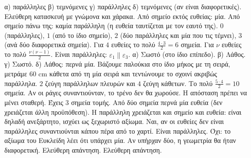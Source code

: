  α) παράλληλες \quad β) τεμνόμενες \quad γ) παράλληλες \quad δ) τεμνόμενες (αν είναι διαφορετικές).
 Ελεύθερη κατασκευή με γνώμονα και χάρακα.
 Από σημείο εκτός ευθείας: μία. Από σημείο πάνω της: καμία παράλληλη (η ευθεία ταυτίζεται με τον εαυτό της).
 $0$ (παράλληλες), $1$ (από το ίδιο σημείο), $2$ (δύο παράλληλες και μία που τις τέμνει), $3$ (ανά δύο διαφορετικά σημεία).
 Για $4$ ευθείες το πολύ $\frac{4\cdot3}{2}=6$ σημεία. Για $\nu$ ευθείες το πολύ $\frac{\nu(\nu-1)}{2}$.
 Είναι παράλληλες: $\varepsilon_1\parallel\varepsilon_3$.
 α) Σωστό (στο ίδιο επίπεδο). β) Λάθος. γ) Σωστό. δ) Λάθος: περνά μία.
 Βάζουμε παλούκια στο ίδιο μήκος με τη σειρά, μετράμε $60$ cm κάθετα από τη μία σειρά και τεντώνουμε το σχοινί ακριβώς παράλληλα.
 $2$ ζεύγη παράλληλων πλευρών και $4$ ζεύγη κάθετων.
 Το πολύ $\frac{5\cdot4}{2}=10$ σημεία.
 Αν οι ράγες συναντιούνταν, το τρένο δεν θα χωρούσε. Η απόσταση πρέπει να μένει σταθερή.
 Έχεις $3$ σημεία τομής.
 Από δύο σημεία περνά μία ευθεία (δεν χρειάζεται άλλη προϋπόθεση). Η παράλληλη χρειάζεται και σημείο και ευθεία: είναι δηλαδή ανεξάρτητο, ισχύει ως ξεχωριστό αξίωμα.
 Ναι, αν οι ευθείες δεν είναι παράλληλες συναντιούνται κάπου πέρα από το χαρτί.
 Είναι παράλληλες.
 Όχι: το αξίωμα του Ευκλείδη λέει ότι υπάρχει μία. Αν υπήρχαν δύο, η γεωμετρία θα ήταν διαφορετική.
 Ελεύθερη απάντηση.
 Ελεύθερη απάντηση.
